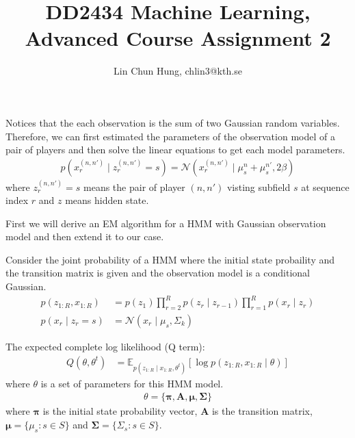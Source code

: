 \documentclass[12pt]{article}
\newenvironment{problem}[2][Problem]{\begin{trivlist}
\item[\hskip \labelsep {\bfseries #1}\hskip \labelsep {\bfseries #2.}]}{\end{trivlist}}
\begin{document}
 
 
\title{DD2434 Machine Learning, Advanced Course Assignment 2}
\author{Lin Chun Hung, chlin3@kth.se}
\maketitle

\begin{problem}{2.6.18}
Notices that the each observation is the sum of two Gaussian random variables.
Therefore, we can first estimated the parameters of the observation model of 
a pair of players and then solve the linear equations to get each model parameters.
\begin{align*}
    p(x_r^{(n,n')}\mid z_r^{(n,n')} = s) = \mathcal{N}(x_r^{(n,n')} \mid \mu^{n}_s + \mu^{n'}_s, 2\beta)
\end{align*}
where $z_r^{(n,n')} = s$ means the pair of player $(n, n')$ visting 
subfield $s$ at sequence index $r$ and $z$ means hidden state.

First we will derive an EM algorithm for a HMM with Gaussian observation model 
and then extend it to our case.

Consider the joint probability of a HMM where the initial state probaility and 
the transition matrix is given and the observation model is a conditional
Gaussian.
\begin{align*}
    p(z_{1:R}, x_{1:R}) &= p(z_1) \prod_{r=2}^{R}p(z_r\mid z_{r-1})
            \prod_{r=1}^{R}p(x_r\mid z_r) \\
    p(x_r\mid z_r=s) &= \mathcal{N}(x_r \mid \mu_s, \Sigma_k)
\end{align*}

The expected complete log likelihood (Q term):
\begin{align*}
    Q(\theta, \theta^{t}) &= \mathbb{E}_{p(z_{1:R}\mid x_{1:R}, \theta^{t})}[
        \log p(z_{1:R}, x_{1:R}\mid \theta)]
\end{align*}
where $\theta$ is a set of parameters for this HMM model.
\begin{align*}
    \theta = \{\bm{\pi}, \bm{A}, \bm{\mu}, \bm{\Sigma}\}
\end{align*}
where $\bm{\pi}$ is the initial state probability vector, $\bm{A}$ is the transition
matrix, $\bm{\mu} = \{ \mu_s: s \in S\}$ and $\bm{\Sigma} = \{ \Sigma_s: s \in S\}$.


\end{problem}
\end{document}
